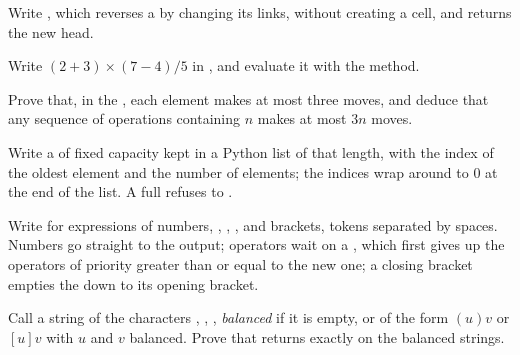 \begin{exercise}[$\star\star$]\label{exo:g12:lists-stacks-queues:10}
Write , which reverses a  by changing its links, without creating a cell, and returns
the new head.
\end{exercise}

\begin{exercise}[$\star\star$]\label{exo:g12:lists-stacks-queues:11}
Write $(2 + 3) \times (7 - 4) / 5$ in , and evaluate it with the  method.
\end{exercise}

\begin{exercise}[$\star\star\star$]\label{exo:g12:lists-stacks-queues:12}
Prove that, in the  , each element makes at most three moves, and deduce that any sequence of
operations containing $n$  makes at most $3n$ moves.
\end{exercise}

\begin{exercise}[$\star\star\star$]\label{exo:g12:lists-stacks-queues:13}
Write a  of fixed capacity kept in a Python list of that length, with the index of the oldest element and the
number of elements; the indices wrap around to $0$ at the end of the list. A full  refuses to .
\end{exercise}

\begin{exercise}[$\star\star\star$]\label{exo:g12:lists-stacks-queues:14}
Write  for expressions of numbers, \code{+}, \code{-}, \code{*}, \code{/} and brackets,
tokens separated by spaces. Numbers go straight to the output; operators wait on a , which first gives up the
operators of priority greater than or equal to the new one; a closing bracket empties the  down to its opening
bracket.
\end{exercise}

\begin{exercise}[$\star\star\star$]\label{exo:g12:lists-stacks-queues:15}
Call a string of the characters \code{(}, \code{)}, \code{[}, \code{]} \emph{balanced} if it is empty, or of the form
$(u)v$ or $[u]v$ with $u$ and $v$ balanced. Prove that  returns  exactly on the balanced
strings.
\end{exercise}

